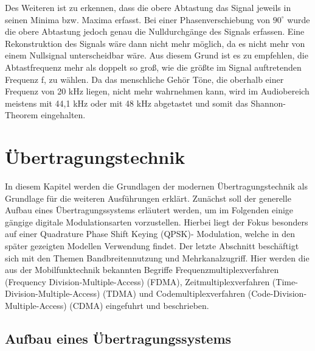 Des Weiteren ist zu erkennen, dass die obere Abtastung das Signal jeweils in seinen Minima
bzw. Maxima erfasst. Bei einer Phasenverschiebung von $90^\circ$ wurde die obere Abtastung jedoch genau die Nulldurchgänge des Signals erfassen. Eine Rekonstruktion des Signals wäre dann nicht mehr möglich, da es nicht mehr von einem Nullsignal unterscheidbar wäre. Aus diesem Grund ist es zu empfehlen, die Abtastfrequenz mehr als doppelt so groß, wie die größte im Signal auftretenden Frequenz f, zu wählen. Da das menschliche Gehör Töne, die oberhalb einer Frequenz von 20 kHz liegen, nicht mehr wahrnehmen kann, wird im Audiobereich meistens mit 44,1 kHz oder mit 48 kHz abgetastet und somit das
Shannon-Theorem eingehalten.\cite{stotzComputergestuetzteAudioUnd2019}




\section{Übertragungstechnik}
\label{subsec:Unterabschnitt1}

In diesem Kapitel werden die Grundlagen der modernen Übertragungstechnik als Grundlage für die weiteren Ausführungen erklärt. Zunächst soll der generelle Aufbau eines Übertragungssystems erläutert werden, um im Folgenden einige gängige digitale Modulationsarten vorzustellen.
Hierbei liegt der Fokus besonders auf einer Quadrature Phase Shift Keying (QPSK)-
Modulation, welche in den später gezeigten Modellen Verwendung findet. Der letzte Abschnitt beschäftigt sich mit den Themen Bandbreitennutzung und Mehrkanalzugriff. Hier werden die aus der Mobilfunktechnik bekannten Begriffe Frequenzmultiplexverfahren (Frequency Division-Multiple-Access) (FDMA), Zeitmultiplexverfahren (Time-Division-Multiple-Access)
(TDMA) und Codemultiplexverfahren (Code-Division-Multiple-Access) (CDMA) eingefuhrt und beschrieben.


\subsection{Aufbau eines Übertragungssystems}
\label{subsec:Unterabschnitt1}

